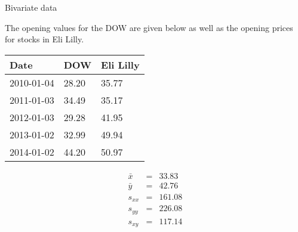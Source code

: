 \documentclass[12pt]{article}
\begin{document}
Bivariate data

The opening values for the DOW are given below as well as the opening
prices for stocks in Eli Lilly.

\begin{multicols}{2}
  \begin{tabular}{l|l|l}
    Date & DOW & Eli Lilly \\ \hline
    2010-01-04 & 28.20 & 35.77 \\
    2011-01-03 & 34.49 & 35.17 \\
    2012-01-03 & 29.28 & 41.95 \\
    2013-01-02 & 32.99 & 49.94 \\
    2014-01-02 & 44.20 & 50.97
  \end{tabular}
  \columnbreak
  \begin{eqnarray*}
    \bar{x} & = & 33.83 \\
    \bar{y} & = & 42.76 \\
    s_{xx}  & = & 161.08 \\
    s_{yy}  & = & 226.08 \\
    s_{xy}  & = & 117.14
  \end{eqnarray*}
\end{multicols}
\end{document}
